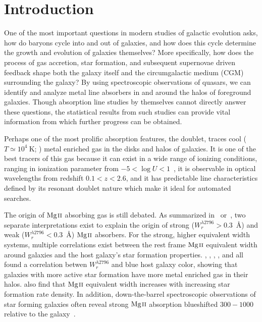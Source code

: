 \documentclass[iop,apj,numberedappendix,appendixfloats,twocolappendix]{emulateapj}
\begin{document}

\section{Introduction}
\label{sec:intro}

One of the most important questions in modern studies of galactic evolution asks, how do baryons cycle into and out of galaxies, and how does this cycle determine the growth and evolution of galaxies themselves? More specifically, how does the process of gas accretion, star formation, and subsequent supernovae driven feedback shape both the galaxy itself and the circumgalactic medium (CGM) surrounding the galaxy? By using spectroscopic observations of quasars, we can identify and analyze metal line absorbers in and around the halos of foreground galaxies. Though absorption line studies by themselves cannot directly answer these questions, the statistical results from such studies can provide vital information from which further progress can be obtained.

Perhaps one of the most prolific absorption features, the {\MgIIdblt} doublet, traces cool ($T \simeq 10^4~\mathrm{K}$; \cite{Churchill2003}) metal enriched gas in the disks and halos of galaxies. It is one of the best tracers of this gas because it can exist in a wide range of ionizing conditions, ranging in ionization parameter from $-5 < \log U < 1$~\citep{Churchill1999}, it is observable in optical wavelengths from redshift $0.1 < z < 2.6$, and it has predictable line characteristics defined by its resonant doublet nature which make it ideal for automated searches. 

The origin of ${\hbox{{\rm Mg}\kern 0.1em{\sc ii}}}$ absorbing gas is still debated. As summarized in~\cite{Kacprzak2011} or~\cite{Matejek2013}, two separate interpretations exist to explain the origin of strong ($W_r^{\lambda2796} > 0.3$~{\AA}) and weak ($W_r^{\lambda2796} < 0.3$~{\AA}) ${\hbox{{\rm Mg}\kern 0.1em{\sc ii}}}$ absorbers. For the strong, higher equivalent width systems, multiple correlations exist between the rest frame ${\hbox{{\rm Mg}\kern 0.1em{\sc ii}}}$ equivalent width around galaxies and the host galaxy's star formation properties. \cite{Zibetti2007}, \cite{Lundgren2009}, \cite{Noterdaeme2010}, \cite{Bordoloi2011}, and \cite{Nestor2011} all found a correlation betwen $W_r^{\lambda2796}$ and blue host galaxy color, showing that galaxies with more active star formation have more metal enriched gas in their halos. \cite{Bordoloi2014} also find that ${\hbox{{\rm Mg}\kern 0.1em{\sc ii}}}$ equivalent width increases with increasing star formation rate density. In addition, down-the-barrel spectroscopic observations of star forming galaxies often reveal strong ${\hbox{{\rm Mg}\kern 0.1em{\sc ii}}}$ absorption blueshifted $300 - 1000$~{\kms} relative to the galaxy~\citep{Tremonti2007,Weiner2009,Martin2009,Rubin2010}. 
\end{document}
